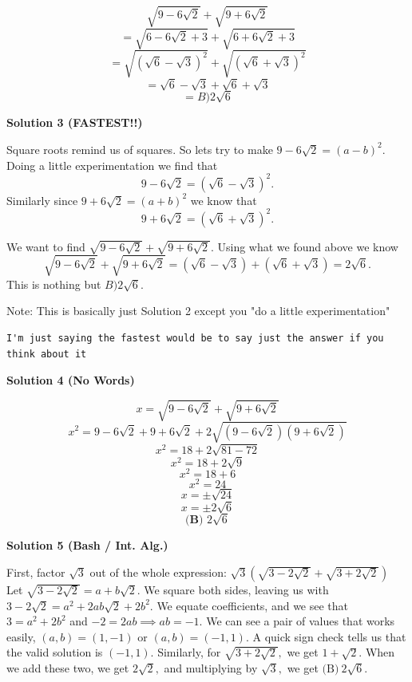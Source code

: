 \begin{enumerate}
 
 \[\sqrt{9-6\sqrt{2}}+\sqrt{9+6\sqrt{2}}\]
 \[= \sqrt{6-6\sqrt{2}+3}+\sqrt{6+6\sqrt{2}+3}\]
 \[= \sqrt{\left(\sqrt{6}-\sqrt{3}\right)^2}+\sqrt{\left(\sqrt{6}+\sqrt{3}\right)^2}\]
 \[= \sqrt{6}-\sqrt{3}+\sqrt{6}+\sqrt{3}\]
 \[= \boxed{B) 2\sqrt{6}}\]




\textbf{Solution 3 (FASTEST!!)}

Square roots remind us of squares. So lets try to make $9 - 6\sqrt{2} = (a-b)^2$. Doing a little experimentation we find that 
 \[9 - 6\sqrt{2} = (\sqrt{6} - \sqrt{3})^2.\] Similarly since $9 + 6\sqrt{2} = (a+b)^2$ we know that 
 \[9 + 6\sqrt{2} = (\sqrt{6} + \sqrt{3})^2.\] 

 We want to find $\sqrt{9-6\sqrt{2}}+\sqrt{9+6\sqrt{2}}$. Using what we found above we know 
 \[\sqrt{9 -6\sqrt{2}}+\sqrt{9+6\sqrt{2}} = (\sqrt{6} - \sqrt{3}) + (\sqrt{6} + \sqrt{3}) = 2\sqrt{6}.\] This is nothing but $\boxed{B) 2\sqrt{6}}$.

 Note: This is basically just Solution 2 except you "do a little experimentation"

 \begin{verbatim}
I'm just saying the fastest would be to say just the answer if you think about it
\end{verbatim}





\textbf{Solution 4 (No Words)}


 \[x=\sqrt{9-6\sqrt{2}}+\sqrt{9+6\sqrt{2}}\]
 \[x^{2}=9-6\sqrt{2}+9+6\sqrt{2}+2\sqrt{\left(9-6\sqrt{2}\right)\left(9+6\sqrt{2}\right)}\]
 \[x^{2}=18+2\sqrt{81-72}\]
 \[x^{2}=18+2\sqrt{9}\]
 \[x^{2}=18+6\]
 \[x^{2}=24\]
 \[x=\pm\sqrt{24}\]
 \[x=\pm2\sqrt{6}\]
 \[\boxed{\textbf{(B) } 2\sqrt{6}}\]




\textbf{Solution 5 (Bash / Int. Alg.)}

First, factor $\sqrt3$ out of the whole expression: $\sqrt3\left(\sqrt{3-2\sqrt2}+\sqrt{3+2\sqrt2}\right)$ Let $\sqrt{3-2\sqrt{2}}=a+b\sqrt2.$ We square both sides, leaving us with $3-2\sqrt{2}=a^2+2ab\sqrt2+2b^2.$ We equate coefficients, and we see that $3=a^2+2b^2$ and $-2=2ab\implies ab=-1.$ We can see a pair of values that works easily, $(a,b)=(1,-1)$ or $(a,b)=(-1,1).$ A quick sign check tells us that the valid solution is $(-1,1).$ Similarly, for $\sqrt{3+2\sqrt{2}},$ we get $1+\sqrt2.$ When we add these two, we get $2\sqrt2,$ and multiplying by $\sqrt3,$ we get $\boxed{\text{(B)}~2\sqrt6}.$ 


\end{enumerate}
